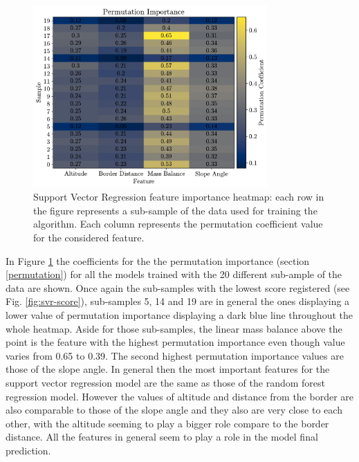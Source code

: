 \begin{figure}[!tp]
	\centering		  
	\includegraphics[width=0.8\textwidth]{figures/SVR_heatmap.pdf}
	\caption{Support Vector Regression feature importance heatmap: each row in the figure represents a sub-sample of the data used for training the algorithm. Each column represents the permutation coefficient value for the considered feature.}
	\label{fig:svr-heatmap}
\end{figure}

In Figure \ref{fig:svr-heatmap} the coefficients for the the permutation importance (section \ref{permutation}) for all the models trained with the 20 different sub-ample of the data are shown. Once again the sub-samples with the lowest score registered (see Fig. \ref{fig:svr-score}), sub-samples 5, 14 and 19 are in general the ones displaying a lower value of permutation importance displaying a dark blue line throughout the whole heatmap. Aside for those sub-samples, the linear mass balance above the point is the feature with the highest permutation importance even though value varies from 0.65 to 0.39. The second highest permutation importance values are those of the slope angle. In general then the most important features for the support vector regression model are the same as those of the random forest regression model. However the values of altitude and distance from the border are also comparable to those of the slope angle and they also are  very close to each other, with the altitude seeming to play a bigger role compare to the border distance. All the features in general seem to play a role in the model final prediction. 

